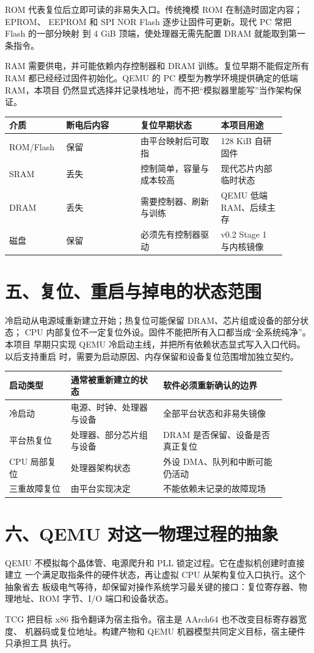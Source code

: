 ROM 代表复位后立即可读的非易失入口。传统掩模 ROM 在制造时固定内容；EPROM、
EEPROM 和 SPI NOR Flash 逐步让固件可更新。现代 PC 常把 Flash 的一部分映射
到 4 GiB 顶端，使处理器无需先配置 DRAM 就能取到第一条指令。

RAM 需要供电，并可能依赖内存控制器和 DRAM 训练。复位早期不能假定所有 RAM
都已经经过固件初始化。QEMU 的 PC 模型为教学环境提供确定的低端 RAM，本项目
仍然显式选择并记录栈地址，而不把“模拟器里能写”当作架构保证。

\begin{longtable}{L{0.16\linewidth}L{0.25\linewidth}L{0.27\linewidth}L{0.22\linewidth}}
\toprule
介质 & 断电后内容 & 复位早期状态 & 本项目用途 \\
\midrule
ROM/Flash & 保留 & 由平台映射后可取指 & 128 KiB 自研固件 \\
SRAM & 丢失 & 控制简单，容量与成本较高 & 现代芯片内部临时状态 \\
DRAM & 丢失 & 需要控制器、刷新与训练 & QEMU 低端 RAM、后续主存 \\
磁盘 & 保留 & 必须先有控制器驱动 & v0.2 Stage 1 与内核镜像 \\
\bottomrule
\end{longtable}

\section{五、复位、重启与掉电的状态范围}

冷启动从电源域重新建立开始；热复位可能保留 DRAM、芯片组或设备的部分状态；
CPU 内部复位不一定复位外设。固件不能把所有入口都当成“全系统纯净”。本项目
早期只实现 QEMU 冷启动主线，并把所有依赖状态显式写入入口代码。以后支持重启
时，需要为启动原因、内存保留和设备复位范围增加独立契约。

\begin{longtable}{L{0.20\linewidth}L{0.30\linewidth}L{0.40\linewidth}}
\toprule
启动类型 & 通常被重新建立的状态 & 软件必须重新确认的边界 \\
\midrule
冷启动 & 电源、时钟、处理器与设备 & 全部平台状态和非易失镜像 \\
平台热复位 & 处理器、部分芯片组与设备 & DRAM 是否保留、设备是否真正复位 \\
CPU 局部复位 & 处理器架构状态 & 外设 DMA、队列和中断可能仍活动 \\
三重故障复位 & 由平台实现决定 & 不能依赖未记录的故障现场 \\
\bottomrule
\end{longtable}

\section{六、QEMU 对这一物理过程的抽象}

QEMU 不模拟每个晶体管、电源爬升和 PLL 锁定过程。它在虚拟机创建时直接建立
一个满足取指条件的硬件状态，再让虚拟 CPU 从架构复位入口执行。这个抽象省去
板级电气等待，却保留对操作系统学习最关键的接口：复位寄存器、物理地址、ROM
字节、I/O 端口和设备状态。

TCG 把目标 x86 指令翻译为宿主指令。宿主是 AArch64 也不改变目标寄存器宽度、
机器码或复位地址。构建产物和 QEMU 机器模型共同定义目标，宿主硬件只承担工具
执行。
